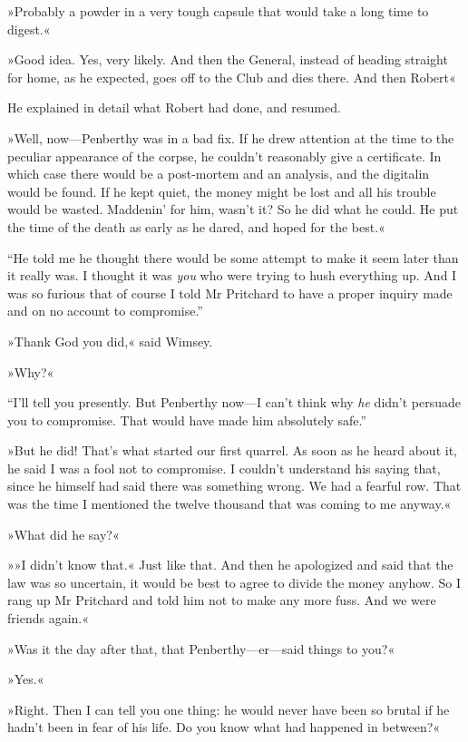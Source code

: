 »Probably a powder in a very tough capsule that would take a long time to digest.«

»Good idea. Yes, very likely. And then the General, instead of heading straight for home, as he expected, goes off to the Club and dies there. And then Robert\longdash«

He explained in detail what Robert had done, and resumed.

»Well, now\allowbreak---\allowbreak Penberthy was in a bad fix. If he drew attention at the time to the peculiar appearance of the corpse, he couldn't reasonably give a certificate. In which case there would be a post-mortem and an analysis, and the digitalin would be found. If he kept quiet, the money might be lost and all his trouble would be wasted. Maddenin' for him, wasn't it? So he did what he could. He put the time of the death as early as he dared, and hoped for the best.«

\enquote{He told me he thought there would be some attempt to make it seem later than it really was. I thought it was \textit{you} who were trying to hush everything up. And I was so furious that of course I told Mr Pritchard to have a proper inquiry made and on no account to compromise.}

»Thank God you did,« said Wimsey.

»Why?«

\enquote{I'll tell you presently. But Penberthy now\allowbreak---\allowbreak I can't think why \textit{he} didn't persuade you to compromise. That would have made him absolutely safe.}

»But he did! That's what started our first quarrel. As soon as he heard about it, he said I was a fool not to compromise. I couldn't understand his saying that, since he himself had said there was something wrong. We had a fearful row. That was the time I mentioned the twelve thousand that was coming to me anyway.«

»What did he say?«

»»I didn't know that.« Just like that. And then he apologized and said that the law was so uncertain, it would be best to agree to divide the money anyhow. So I rang up Mr Pritchard and told him not to make any more fuss. And we were friends again.«

»Was it the day after that, that Penberthy\allowbreak---\allowbreak er---said things to you?«

»Yes.«

»Right. Then I can tell you one thing: he would never have been so brutal if he hadn't been in fear of his life. Do you know what had happened in between?«

